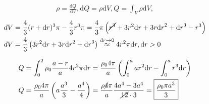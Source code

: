 \begin{align*}
    \rho = \frac{\mathrm dQ}{\mathrm dV}, \mathrm dQ = \rho\mathrm dV, Q = \int_V\rho\mathrm dV,
\end{align*}
\begin{align*}
    dV &= \frac{4}{3}(r + \mathrm dr)^3\pi - \frac{4}{3}r^3\pi = \frac{4}{3}\pi\left(\cancel{r^3} + 3r^2\mathrm dr + 3r{\mathrm dr}^2 + {\mathrm dr}^3 - r^3\right)\\
    dV &= \frac{4}{3}\left(3r^2\mathrm dr + 3r{\mathrm dr}^2 + {\mathrm dr}^3\right)
    \overset{\mathrm dr\rightarrow 0}{\approx} 4r^2\pi\mathrm dr, \mathrm dr > 0
\end{align*}

\begin{align*}
    Q &= \int_0^2\rho_0\frac{a - r}{a}4r^2\pi\mathrm dr = \frac{\rho_0 4\pi}{a}\left(\int_0^a ar^2\mathrm dr - \int_0^a r^3\mathrm dr\right)\\
    Q &= \frac{\rho_04\pi}{a}\left(a\frac{a^3}{3} - \frac{a^4}{4}\right) = \frac{\rho\cancel{4}\pi}{a}\frac{4a^4 - 3a^4}{\cancel{12}\cdot 3} = \boxed{\frac{\rho_0\pi a^3}{3}}
\end{align*}